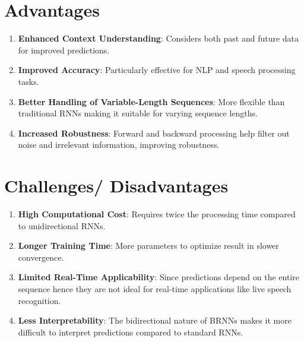 \section{Advantages}

\begin{enumerate}
    \item \textbf{Enhanced Context Understanding}: Considers both past and future data for improved predictions.
    \hfill \cite{geeksforgeeks/deep-learning/bidirectional-recurrent-neural-network}

    \item \textbf{Improved Accuracy}: Particularly effective for NLP and speech processing tasks.
    \hfill \cite{geeksforgeeks/deep-learning/bidirectional-recurrent-neural-network}
    
    \item \textbf{Better Handling of Variable-Length Sequences}: More flexible than traditional RNNs making it suitable for varying sequence lengths.
    \hfill \cite{geeksforgeeks/deep-learning/bidirectional-recurrent-neural-network}
    
    \item \textbf{Increased Robustness}: Forward and backward processing help filter out noise and irrelevant information, improving robustness.
    \hfill \cite{geeksforgeeks/deep-learning/bidirectional-recurrent-neural-network}
\end{enumerate}



\section{Challenges/ Disadvantages}

\begin{enumerate}
    \item \textbf{High Computational Cost}: Requires twice the processing time compared to unidirectional RNNs.
    \hfill \cite{geeksforgeeks/deep-learning/bidirectional-recurrent-neural-network}
    
    \item \textbf{Longer Training Time}: More parameters to optimize result in slower convergence.
    \hfill \cite{geeksforgeeks/deep-learning/bidirectional-recurrent-neural-network}
    
    \item \textbf{Limited Real-Time Applicability}: Since predictions depend on the entire sequence hence they are not ideal for real-time applications like live speech recognition.
    \hfill \cite{geeksforgeeks/deep-learning/bidirectional-recurrent-neural-network}
    
    \item \textbf{Less Interpretability}: The bidirectional nature of BRNNs makes it more difficult to interpret predictions compared to standard RNNs.
    \hfill \cite{geeksforgeeks/deep-learning/bidirectional-recurrent-neural-network}
\end{enumerate}




